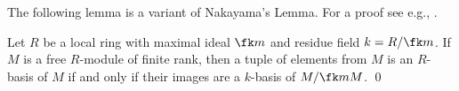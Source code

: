 \documentclass[a4paper, 11pt]{article}
\begin{document}
%	
%	
%
%	
%	

The following lemma is a variant of Nakayama's Lemma. For a proof see e.g., \cite[Chapter~X, Theorem 4.4]{Lang:Algebra}.

\begin{lemma}\label{lem:fingen}
	Let $R$ be a local ring with maximal ideal $\fk m$ and residue field $k=R/\fk m$. If $M$ is a free $R$-module of finite rank, then a tuple of elements from $M$ is an $R$-basis of $M$ if and only if their images are a $k$-basis of $M/\fk m M$.	\qed
\end{lemma}
\end{document}
